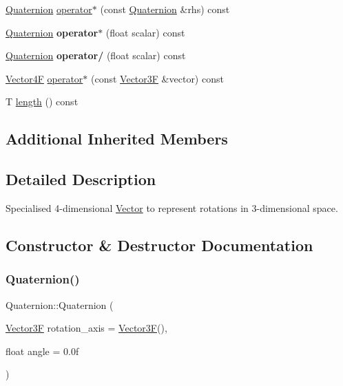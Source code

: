 \begin{DoxyCompactItemize}
\mbox{\hyperlink{class_quaternion}{Quaternion}} \mbox{\hyperlink{class_quaternion_a7cc9bf508bfd8d521a0d246a2cb47194}{operator$\ast$}} (const \mbox{\hyperlink{class_quaternion}{Quaternion}} \&rhs) const
\item 
\mbox{\label{class_quaternion_af19d7a5554539ad967b8c913939dacb6}} 
\mbox{\hyperlink{class_quaternion}{Quaternion}} {\bfseries operator$\ast$} (float scalar) const
\item 
\mbox{\label{class_quaternion_abf1b9fe3ab980e5c97ff0f89c7da9a76}} 
\mbox{\hyperlink{class_quaternion}{Quaternion}} {\bfseries operator/} (float scalar) const
\item 
\mbox{\hyperlink{class_vector4}{Vector4F}} \mbox{\hyperlink{class_quaternion_af0ec7fb0212b1761149d9bd36bf87455}{operator$\ast$}} (const \mbox{\hyperlink{class_vector3}{Vector3F}} \&vector) const
\item 
T \mbox{\hyperlink{class_quaternion_a1c8ab62fe32713c21353d71a1b23b0f2}{length}} () const
\end{DoxyCompactItemize}
\subsection*{Additional Inherited Members}


\subsection{Detailed Description}
Specialised 4-\/dimensional \mbox{\hyperlink{class_vector}{Vector}} to represent rotations in 3-\/dimensional space. 

\subsection{Constructor \& Destructor Documentation}
\mbox{\label{class_quaternion_a2f9345c4e4ea54370b26cce4d5b075c2}} 
\subsubsection{\texorpdfstring{Quaternion()}{Quaternion()}\hspace{0.1cm}{\footnotesize\ttfamily [1/3]}}
{\footnotesize\ttfamily Quaternion\+::\+Quaternion (\begin{DoxyParamCaption}\item[{\mbox{\hyperlink{class_vector3}{Vector3F}}}]{rotation\+\_\+axis = {\ttfamily \mbox{\hyperlink{class_vector3}{Vector3F}}()},  }\item[{float}]{angle = {\ttfamily 0.0f} }\end{DoxyParamCaption})}

